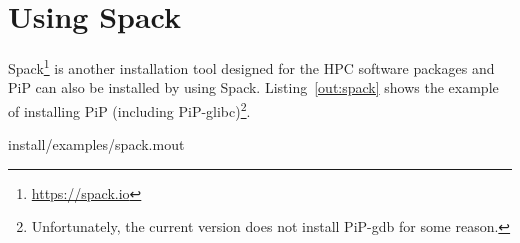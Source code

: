 
\section{Using Spack}

Spack\footnote{\url{https://spack.io}} is another installation tool
designed for the HPC software packages and PiP can also be installed
by using Spack. Listing~\ref{out:spack} shows the example of
installing PiP (including PiP-glibc)\footnote{Unfortunately, the
current version does not install PiP-gdb for some reason.}.


                {install/examples/spack.mout}

